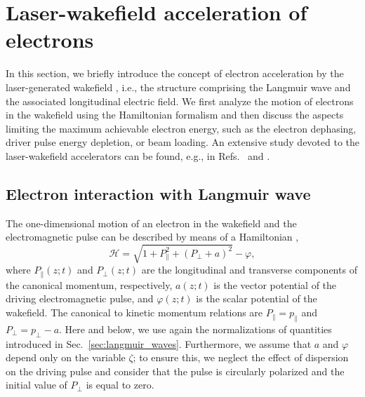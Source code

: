 \documentclass[10pt, a4paper, twoside, openright]{report}
\begin{document}

\section{Laser-wakefield acceleration of electrons\label{sec:lwfa}}
%

In this section, we briefly introduce the concept of electron acceleration by the laser-generated wakefield \cite{Tajima1979}, i.e., the structure comprising the Langmuir wave and the associated longitudinal electric field. We first analyze the motion of electrons in the wakefield using the Hamiltonian formalism and then discuss the aspects limiting the maximum achievable electron energy, such as the electron dephasing, driver pulse energy depletion, or beam loading. An extensive study devoted to the laser-wakefield accelerators can be found, e.g., in Refs.~ and .



\subsection{Electron interaction with Langmuir wave}
%

The one-dimensional motion of an electron in the wakefield and the electromagnetic pulse can be described by means of a Hamiltonian \cite{Esirkepov2006, Esarey2009, Bulanov2013, Bulanov2016},
\begin{equation}\label{eq:hamiltonian}
\mathcal{H} = \sqrt{1 + P_{\parallel}^2 + \left( P_{\bot} + a \right)^2} - \varphi,
\end{equation}
where $ P_{\parallel} \left( z; t \right) $ and $ P_{\bot} \left( z; t \right) $ are the longitudinal and transverse components of the canonical momentum, respectively, $ a \left( z; t \right) $ is the vector potential of the driving electromagnetic pulse, and $ \varphi \left( z; t \right) $ is the scalar potential of the wakefield. The canonical to kinetic momentum relations are $ P_{\parallel} = p_{\parallel} $ and $ P_{\bot} = p_{\bot} - a $. Here and below, we use again the normalizations of quantities introduced in Sec.~\ref{sec:langmuir_waves}. Furthermore, we assume that $ a $ and $ \varphi $ depend only on the variable $ \zeta $; to ensure this, we neglect the effect of dispersion on the driving pulse and consider that the pulse is circularly polarized and the initial value of $ P_{\bot} $ is equal to zero.
\end{document}
